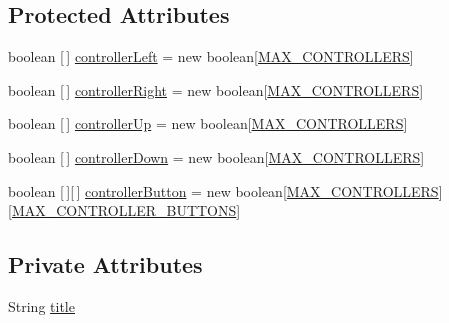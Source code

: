 \subsection*{Protected Attributes}
\begin{DoxyCompactItemize}
\item 
boolean \mbox{[}$\,$\mbox{]} \mbox{\hyperlink{classorg_1_1newdawn_1_1slick_1_1_basic_game_ab9942a3607c7c1bb9f68c7f49514edb6}{controller\+Left}} = new boolean\mbox{[}\mbox{\hyperlink{classorg_1_1newdawn_1_1slick_1_1_basic_game_ae6a83ff9654d52fa13678d974cf80b27}{M\+A\+X\+\_\+\+C\+O\+N\+T\+R\+O\+L\+L\+E\+RS}}\mbox{]}
\item 
boolean \mbox{[}$\,$\mbox{]} \mbox{\hyperlink{classorg_1_1newdawn_1_1slick_1_1_basic_game_a63084cb6b54023c5c9dc4f27aa611e38}{controller\+Right}} = new boolean\mbox{[}\mbox{\hyperlink{classorg_1_1newdawn_1_1slick_1_1_basic_game_ae6a83ff9654d52fa13678d974cf80b27}{M\+A\+X\+\_\+\+C\+O\+N\+T\+R\+O\+L\+L\+E\+RS}}\mbox{]}
\item 
boolean \mbox{[}$\,$\mbox{]} \mbox{\hyperlink{classorg_1_1newdawn_1_1slick_1_1_basic_game_ac57500e9873e5634ed07cdba8b9c1d58}{controller\+Up}} = new boolean\mbox{[}\mbox{\hyperlink{classorg_1_1newdawn_1_1slick_1_1_basic_game_ae6a83ff9654d52fa13678d974cf80b27}{M\+A\+X\+\_\+\+C\+O\+N\+T\+R\+O\+L\+L\+E\+RS}}\mbox{]}
\item 
boolean \mbox{[}$\,$\mbox{]} \mbox{\hyperlink{classorg_1_1newdawn_1_1slick_1_1_basic_game_a1e5447288fb667f4a688b930899379cb}{controller\+Down}} = new boolean\mbox{[}\mbox{\hyperlink{classorg_1_1newdawn_1_1slick_1_1_basic_game_ae6a83ff9654d52fa13678d974cf80b27}{M\+A\+X\+\_\+\+C\+O\+N\+T\+R\+O\+L\+L\+E\+RS}}\mbox{]}
\item 
boolean \mbox{[}$\,$\mbox{]}\mbox{[}$\,$\mbox{]} \mbox{\hyperlink{classorg_1_1newdawn_1_1slick_1_1_basic_game_a77093ea9bb39adc83d2c1a0212efdf01}{controller\+Button}} = new boolean\mbox{[}\mbox{\hyperlink{classorg_1_1newdawn_1_1slick_1_1_basic_game_ae6a83ff9654d52fa13678d974cf80b27}{M\+A\+X\+\_\+\+C\+O\+N\+T\+R\+O\+L\+L\+E\+RS}}\mbox{]}\mbox{[}\mbox{\hyperlink{classorg_1_1newdawn_1_1slick_1_1_basic_game_a87e5dc92b0b1138bfa8d11d2f6c6ac70}{M\+A\+X\+\_\+\+C\+O\+N\+T\+R\+O\+L\+L\+E\+R\+\_\+\+B\+U\+T\+T\+O\+NS}}\mbox{]}
\end{DoxyCompactItemize}
\subsection*{Private Attributes}
\begin{DoxyCompactItemize}
\item 
String \mbox{\hyperlink{classorg_1_1newdawn_1_1slick_1_1_basic_game_a7d56224aca7f48d84cbd9f1d55cc5a70}{title}}
\end{DoxyCompactItemize}
